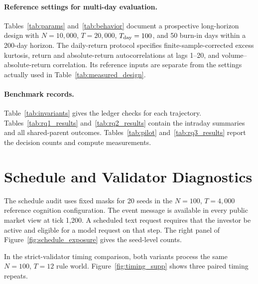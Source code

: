 \paragraph{Reference settings for multi-day evaluation.}
Tables~\ref{tab:params} and~\ref{tab:behavior} document a prospective long-horizon design with $N=10{,}000$, $T=20{,}000$, $T_{\rm day}=100$, and 50 burn-in days within a 200-day horizon. The daily-return protocol specifies finite-sample-corrected excess kurtosis, return and absolute-return autocorrelations at lags 1--20, and volume--absolute-return correlation. Its reference inputs are separate from the settings actually used in Table~\ref{tab:measured_design}.




\paragraph{Benchmark records.}
Table~\ref{tab:invariants} gives the ledger checks for each trajectory. Tables~\ref{tab:rq1_results} and~\ref{tab:rq2_results} contain the intraday summaries and all shared-parent outcomes. Tables~\ref{tab:pilot} and~\ref{tab:rq3_results} report the decision counts and compute measurements.







\section{Schedule and Validator Diagnostics}
\label{app:timing}

The schedule audit uses fixed masks for 20 seeds in the $N=100$, $T=4{,}000$ reference cognition configuration. The event message is available in every public market view at tick 1,200. A scheduled text request requires that the investor be active and eligible for a model request on that step. The right panel of Figure~\ref{fig:schedule_exposure} gives the seed-level counts.

In the strict-validator timing comparison, both variants process the same $N=100$, $T=12$ rule world. Figure~\ref{fig:timing_supp} shows three paired timing repeats.

